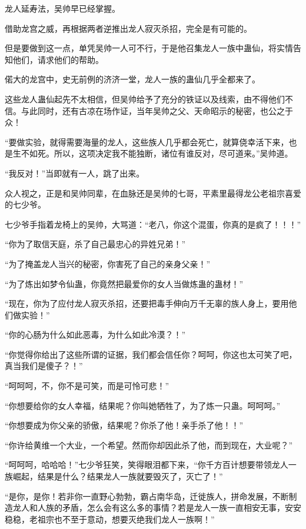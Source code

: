 \begin{this_body}
龙人延寿法，吴帅早已经掌握。

借助龙宫之威，再根据两者逆推出龙人寂灭杀招，完全是有可能的。

但是要做到这一点，单凭吴帅一人可不行，于是他召集龙人一族中蛊仙，将实情告知他们，请求他们的帮助。

偌大的龙宫中，史无前例的济济一堂，龙人一族的蛊仙几乎全都来了。

这些龙人蛊仙起先不太相信，但吴帅给予了充分的铁证以及线索，由不得他们不信。与此同时，还有古凉在场作证，当年吴帅之父、天命昭示的秘密，也公之于众！

“要做实验，就得需要海量的龙人，这些族人几乎都会死亡，就算侥幸活下来，也是生不如死。所以，这项决定我不能独断，诸位有谁反对，尽可道来。”吴帅道。

“我反对！”当即就有一人，跳了出来。

众人视之，正是和吴帅同辈，在血脉还是吴帅的七哥，平素里最得龙公老祖宗喜爱的七少爷。

七少爷手指着龙椅上的吴帅，大骂道：“老八，你这个混蛋，你真的是疯了！！！”

“你为了取信天庭，杀了自己最忠心的异姓兄弟！”

“为了掩盖龙人当兴的秘密，你害死了自己的亲身父亲！”

“为了炼出如梦令仙蛊，你竟然把最爱你的女人当做炼蛊的蛊材！”

“现在，你为了应付龙人寂灭杀招，还要把毒手伸向万千无辜的族人身上，要用他们做实验！”

“你的心肠为什么如此恶毒，为什么如此冷漠？！”

“你觉得你给出了这些所谓的证据，我们都会信任你？呵呵，你这也太可笑了吧，真当我们是傻子？！”

“呵呵呵，不，你不是可笑，而是可怜可悲！”

“你想要给你的女人幸福，结果呢？你叫她牺牲了，为了炼一只蛊。呵呵呵。”

“你想要成为你父亲的骄傲，结果呢？你杀了他！亲手杀了他！！”

“你许给黄维一个大业，一个希望。然而你却因此杀了他，而到现在，大业呢？”

“呵呵呵，哈哈哈！”七少爷狂笑，笑得眼泪都下来，“你千方百计想要带领龙人一族崛起，结果是什么？结果龙人一族就要毁灭了，灭亡了！”

“是你，是你！若非你一直野心勃勃，霸占南华岛，迁徙族人，拼命发展，不断制造龙人和人族的矛盾，怎么会有这么多的事情？若是龙人一族一直相安无事，安安稳稳，老祖宗也不至于意动，想要灭绝我们龙人一族啊！”


\end{this_body}
